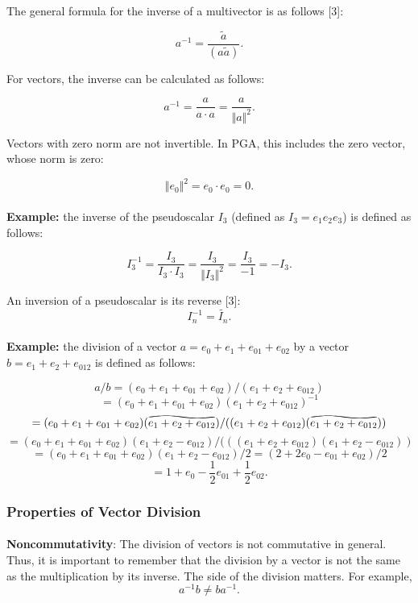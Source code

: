 \documentclass{article}
\newcommand\reallywidetilde[1]{\ThisStyle{%
  \setbox0=\hbox{$\SavedStyle#1$}%
  \stackengine{-.1\LMpt}{$\SavedStyle#1$}{%
    \stretchto{\scaleto{\SavedStyle\mkern.2mu\AC}{.5150\wd0}}{.6\ht0}%
  }{O}{c}{F}{T}{S}%
}}
\begin{document}
    The general formula for the inverse of a multivector is as follows [3]:

    $$a^{-1} = \frac{\tilde{a}}{(a\tilde{a})}.$$
    
    For vectors, the inverse can be calculated as follows:

    $$a^{-1} = \frac{a}{a \cdot a} = \frac {a}{\Vert{a}\Vert^2}.$$
    
    Vectors with zero norm are not invertible. In PGA, this includes the zero vector, whose norm is zero:

    $$\Vert{e_0}\Vert^2 = e_0 \cdot e_0 = 0.$$

    

\paragraph{}\textbf{Example:} the inverse of the pseudoscalar $I_3$ (defined as $I_3 = e_1 e_2 e_3$) is defined as follows:

$$I_3^{-1} = \frac{I_3}{I_3 \cdot I_3} = \frac {I_3}{\Vert{I_3}\Vert^2} = \frac {I_3}{-1} = -I_3.$$

An inversion of a pseudoscalar is its reverse [3]: $$I_n^{-1} = \tilde{I_n}.$$

\paragraph{}\textbf{Example:} the division of a vector $a = e_{0} + e_{1} + e_{01} + e_{02}$ by a vector 
$b = e_1 + e_2 + e_{012}$ is defined as follows:

$$a/b = (e_{0} + e_{1} + e_{01} + e_{02}) / (e_1 + e_2 + e_{012})$$
$$= (e_0 + e_1 + e_{01} + e_{02})(e_1 + e_2 + e_{012})^{-1}$$
$$= (e_0 + e_1 + e_{01} + e_{02})(\reallywidetilde{e_1 + e_2 + e_{012}})/((e_1 + e_2 + e_{012})(\reallywidetilde{e_1 + e_2 + e_{012}}))$$
$$= (e_0 + e_1 + e_{01} + e_{02})({e_1 + e_2 - e_{012}})/(((e_1 + e_2 + e_{012})({e_1 + e_2 - e_{012}}))$$
$$= (e_0 + e_1 + e_{01} + e_{02})({e_1 + e_2 - e_{012}})/2 = (2 + 2e_0 - e_{01} + e_{02}) / 2$$
$$= 1 + e_0 - \frac{1}{2}e_{01} + \frac{1}{2}e_{02}.$$

 

\subsubsection{\textbf{Properties of Vector Division}}

\paragraph{}\textbf{Noncommutativity}: The division of vectors is not commutative in general. Thus, it is important to
remember that the division by a vector is not the same as the multiplication by its inverse. The side of the division
matters. For example, $$a^{-1}b \neq ba^{-1}.$$
\end{document}
